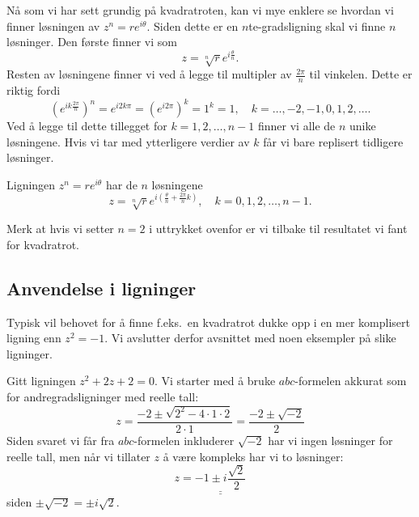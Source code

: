 \documentclass[a4paper,norsk,12pt]{article}
\newcommand{\ans}[1]{\underline{\underline{#1}}}
\newcounter{exa}
\begin{document}
Nå som vi har sett grundig på kvadratroten, kan vi mye enklere se hvordan vi finner løsningen av $z^n = re^{i\theta}$. Siden dette er en $n$te-gradsligning skal vi finne $n$ løsninger. Den første finner vi som
\begin{displaymath}
	z = \sqrt[n]{r}e^{i\frac{\theta}{n}}.
\end{displaymath}
Resten av løsningene finner vi ved å legge til multipler av $\frac{2\pi}{n}$ til vinkelen. Dette er riktig fordi
\begin{displaymath}
	\left(e^{ik\frac{2\pi}{n}}\right)^n = e^{i2k\pi} = (e^{i2\pi})^k = 1^k = 1, \quad k =  \ldots, -2, -1, 0, 1, 2, \ldots.
\end{displaymath}
Ved å legge til dette tillegget for $k=1, 2, \ldots, n-1$ finner vi alle de $n$ unike løsningene. Hvis vi tar med ytterligere verdier av $k$ får vi bare replisert tidligere løsninger.
\begin{tsummary}
	Ligningen $z^n = re^{i\theta}$ har de $n$ løsningene
	\begin{displaymath}
		z = \sqrt[n]{r}e^{i\left(\frac{\theta}{n} + \frac{2\pi}{n}k\right)}, \quad k=0,1,2,\ldots, n-1.
	\end{displaymath}
\end{tsummary}
\noindent
Merk at hvis vi setter $n=2$ i uttrykket ovenfor er vi tilbake til resultatet vi fant for kvadratrot.

\subsection{Anvendelse i ligninger}
Typisk vil behovet for å finne f.eks.~en kvadratrot dukke opp i en mer komplisert ligning enn $z^2=-1$. Vi avslutter derfor avsnittet med noen eksempler på slike ligninger.
\begin{texample}
Gitt ligningen $z^2 + 2z + 2 = 0$. Vi starter med å bruke $abc$-formelen akkurat som for andregradsligninger med reelle tall:
\begin{displaymath}
	z = \frac{-2\pm\sqrt{2^2-4\cdot1\cdot2}}{2\cdot 1}= \frac{-2\pm\sqrt{-2}}{2}
\end{displaymath}
Siden svaret vi får fra $abc$-formelen inkluderer $\sqrt{-2}$ har vi ingen løsninger for reelle tall, men når vi tillater $z$ å være kompleks har vi to løsninger:
\begin{displaymath}
	z= \ans{-1 \pm i\frac{\sqrt{2}}{2}}
\end{displaymath}
siden $\pm\sqrt{-2} = \pm i\sqrt{2}$. 
\end{texample}
\end{document}
